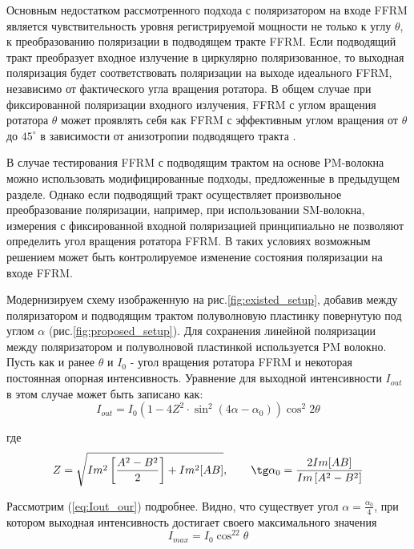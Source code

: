 \documentclass{article}
\begin{document}
Основным недостатком рассмотренного подхода с поляризатором на входе FFRM является чувствительность уровня регистрируемой мощности не только к углу $\theta$, к преобразованию поляризации в подводящем тракте FFRM.
Если подводящий тракт преобразует входное излучение в циркулярно поляризованное, то  выходная поляризация будет соответствовать поляризации на выходе идеального FFRM, независимо от фактического угла вращения ротатора.
В общем случае при фиксированной поляризации входного излучения, FFRM с углом вращения ротатора $\theta$ может проявлять себя как FFRM с эффективным углом вращения от $\theta$ до $45^\circ$ в зависимости от анизотропии подводящего тракта \autocite{buchilkoAnalysisStatePolarization2024}.

В случае тестирования FFRM с подводящим трактом на основе PM-волокна можно использовать модифицированные подходы, предложенные в предыдущем разделе.
Однако если подводящий тракт осуществляет произвольное преобразование поляризации, например, при использовании SM-волокна, измерения с фиксированной входной поляризацией принципиально не позволяют определить угол вращения ротатора FFRM.
В таких условиях возможным решением может быть контролируемое изменение состояния поляризации на входе FFRM.

Модернизируем схему изображенную на рис.\ref{fig:existed_setup}, добавив  между поляризатором и подводящим трактом полуволновую пластинку повернутую под углом $\alpha$ (рис.\ref{fig:proposed_setup}).
Для сохранения линейной поляризации между поляризатором и полуволновой пластинкой используется PM волокно.
Пусть как и ранее $\theta$ и $I_0$ -  угол вращения ротатора FFRM и некоторая постоянная опорная интенсивность.
Уравнение для выходной интенсивности $I_{out}$ в этом случае  может быть записано как:
\begin{equation}
	\label{eq:Iout_our}
	I_{out} =  I_0 \left( 1 - 4 Z^2 \cdot \sin^2(4\alpha - \alpha_0)\right)  \cos^2 2 \theta
\end{equation}

где
\begin{equation}
	Z = \sqrt{Im^2\left[\frac{A^2-B^2}{2}\right]+Im^2[AB]}, \qquad  \tg\alpha_0 = \frac{2Im[AB]}{Im\left[A^2 - B^2\right]}
\end{equation}

Рассмотрим (\ref{eq:Iout_our}) подробнее.
Видно, что существует угол $\alpha = \frac{\alpha_0}{4}$, при котором выходная интенсивность достигает своего максимального значения
\begin{equation}
	\label{eq:Imax}
	I_{max} = I_0\cos^22\theta
\end{equation}
\end{document}
